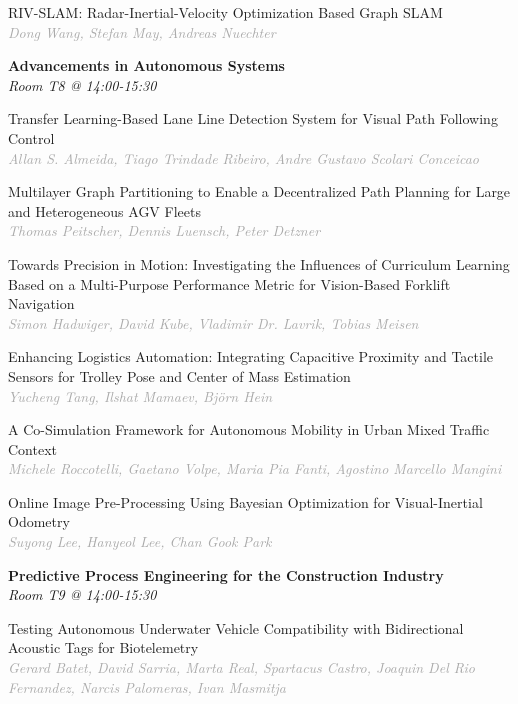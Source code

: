 \begin{multicols*}{2}
\small RIV-SLAM: Radar-Inertial-Velocity Optimization Based Graph SLAM\\ 
\footnotesize \textcolor{darkgray}{\textit{Dong Wang, Stefan  May, Andreas  Nuechter}}

\normalsize \textbf{Advancements in Autonomous Systems}\\
\small \textit{Room T8 @ 14:00-15:30}

\small Transfer Learning-Based Lane Line Detection System for Visual Path Following Control\\ 
\footnotesize \textcolor{darkgray}{\textit{Allan S. Almeida, Tiago  Trindade Ribeiro, Andre Gustavo  Scolari Conceicao}}

\small Multilayer Graph Partitioning to Enable a Decentralized Path Planning for Large and Heterogeneous AGV Fleets\\ 
\footnotesize \textcolor{darkgray}{\textit{Thomas Peitscher, Dennis  Luensch, Peter  Detzner}}

\small Towards Precision in Motion: Investigating the Influences of Curriculum Learning Based on a Multi-Purpose Performance Metric for Vision-Based Forklift Navigation\\ 
\footnotesize \textcolor{darkgray}{\textit{Simon Hadwiger, David  Kube, Vladimir  Dr. Lavrik, Tobias  Meisen}}

\small Enhancing Logistics Automation: Integrating Capacitive Proximity and Tactile Sensors for Trolley Pose and Center of Mass Estimation\\ 
\footnotesize \textcolor{darkgray}{\textit{Yucheng Tang, Ilshat  Mamaev, Björn  Hein}}

\small A Co-Simulation Framework for Autonomous Mobility in Urban Mixed Traffic Context\\ 
\footnotesize \textcolor{darkgray}{\textit{Michele Roccotelli, Gaetano  Volpe, Maria Pia  Fanti, Agostino Marcello  Mangini}}

\small Online Image Pre-Processing Using Bayesian Optimization for Visual-Inertial Odometry\\ 
\footnotesize \textcolor{darkgray}{\textit{Suyong Lee, Hanyeol  Lee, Chan Gook  Park}}

\normalsize \textbf{Predictive Process Engineering for the Construction Industry}\\
\small \textit{Room T9 @ 14:00-15:30}

\small Testing Autonomous Underwater Vehicle Compatibility with Bidirectional Acoustic Tags for Biotelemetry\\ 
\footnotesize \textcolor{darkgray}{\textit{Gerard Batet, David  Sarria, Marta  Real, Spartacus  Castro, Joaquin  Del Rio Fernandez, Narcis  Palomeras, Ivan  Masmitja}}


\end{multicols*}
